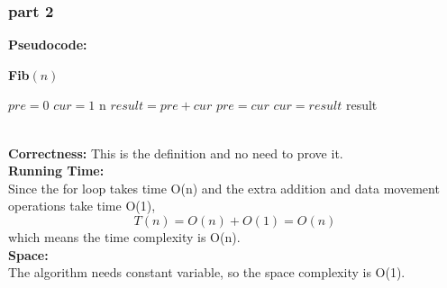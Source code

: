 \documentclass[twoside]{homework}
\begin{document}
\subsubsection*{part 2} 
\textbf{Pseudocode:} \quad
\begin{algorithm}
	\caption*{\textbf{Fib}$(n)$}
	\begin{algorithmic}
		\STATE $pre=0$
		\STATE $cur=1$
		\RETURN n
		\ENDIF
		\STATE $result=pre+cur$
		\STATE $pre=cur$
		\STATE $cur=result$
		\ENDFOR
		\RETURN result
	\end{algorithmic}		
\end{algorithm}
\\\textbf{Correctness:} \quad
This is the definition and no need to prove it.
\\\textbf{Running Time:} \quad
\\Since the for loop takes time O(n) and the extra addition and data movement operations take time O(1),
$$T(n)=O(n)+O(1)=O(n)$$
which means the time complexity is O(n).
\\\textbf{Space:} \quad
\\The algorithm needs constant variable, so the space complexity is O(1).
\end{document}
